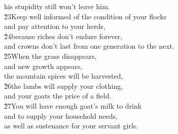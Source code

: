 \begin{poetry}
\poemlll       his stupidity still won't leave him. \\
\poeml \v{23}Keep well informed of the condition of your flocks \\
\poemll    and pay attention to your herds, \\
\poeml \v{24}because riches don't endure forever, \\
\poemll    and crowns don't last from one generation to the next. \\
\poeml \v{25}When the grass disappears, \\
\poemll    and new growth appears, \\
\poemlll       the mountain spices will be harvested, \\
\poeml \v{26}the lambs will supply your clothing, \\
\poemll    and your goats the price of a field. \\
\poeml \v{27}You will have enough goat's milk to drink \\
\poemll    and to supply your household needs, \\
\poemlll       as well as sustenance for your servant girls.
\end{poetry}

